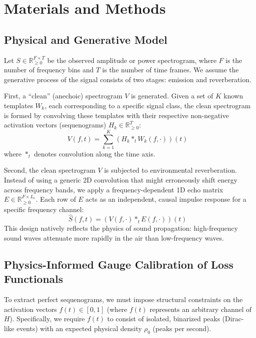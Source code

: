 \documentclass[11pt,a4paper]{article}
\begin{document}
\section{Materials and Methods}

\subsection{Physical and Generative Model}
Let $S \in \mathbb{R}_{\ge 0}^{F \times T}$ be the observed amplitude or power spectrogram, where $F$ is the number of frequency bins and $T$ is the number of time frames. We assume the generative process of the signal consists of two stages: emission and reverberation.

First, a ``clean'' (anechoic) spectrogram $V$ is generated. Given a set of $K$ known templates $W_k$, each corresponding to a specific signal class, the clean spectrogram is formed by convolving these templates with their respective non-negative activation vectors (sequenograms) $H_k \in \mathbb{R}_{\ge 0}^{T}$:
\begin{equation}
V(f, t) = \sum_{k=1}^{K} (H_k *_{t} W_k(f, \cdot))(t)
\end{equation}
where $*_{t}$ denotes convolution along the time axis.

Second, the clean spectrogram $V$ is subjected to environmental reverberation. Instead of using a generic 2D convolution that might erroneously shift energy across frequency bands, we apply a frequency-dependent 1D echo matrix $E \in \mathbb{R}_{\ge 0}^{F \times L_e}$. Each row of $E$ acts as an independent, causal impulse response for a specific frequency channel:
\begin{equation}
\hat{S}(f, t) = (V(f, \cdot) *_{t} E(f, \cdot))(t)
\end{equation}
This design natively reflects the physics of sound propagation: high-frequency sound waves attenuate more rapidly in the air than low-frequency waves.

\subsection{Physics-Informed Gauge Calibration of Loss Functionals}
To extract perfect sequenograms, we must impose structural constraints on the activation vectors $f(t) \in [0,1]$ (where $f(t)$ represents an arbitrary channel of $H$). Specifically, we require $f(t)$ to consist of isolated, binarized peaks (Dirac-like events) with an expected physical density $\rho_0$ (peaks per second). 
\end{document}
